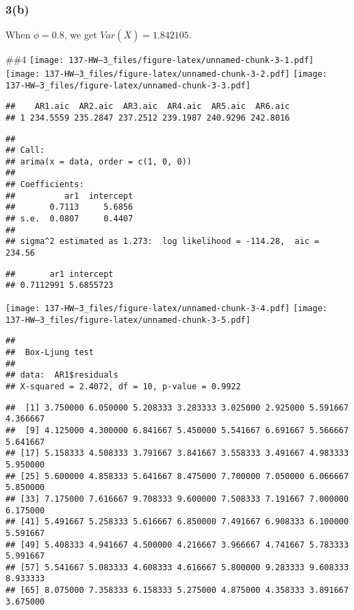 \documentclass[
]{article}
\begin{document}
\hypertarget{b-1}{%
\subsubsection{3(b)}\label{b-1}}

When \(\phi=0.8\), we get \(Var(\overline{X})= 1.842105\).

\#\#4
\texttt{[image: 137-HW--3\_files/figure-latex/unnamed-chunk-3-1.pdf]}
\texttt{[image: 137-HW--3\_files/figure-latex/unnamed-chunk-3-2.pdf]}
\texttt{[image: 137-HW--3\_files/figure-latex/unnamed-chunk-3-3.pdf]}

\begin{verbatim}
##    AR1.aic  AR2.aic  AR3.aic  AR4.aic  AR5.aic  AR6.aic
## 1 234.5559 235.2847 237.2512 239.1987 240.9296 242.8016
\end{verbatim}

\begin{verbatim}
## 
## Call:
## arima(x = data, order = c(1, 0, 0))
## 
## Coefficients:
##          ar1  intercept
##       0.7113     5.6856
## s.e.  0.0807     0.4407
## 
## sigma^2 estimated as 1.273:  log likelihood = -114.28,  aic = 234.56
\end{verbatim}

\begin{verbatim}
##       ar1 intercept 
## 0.7112991 5.6855723
\end{verbatim}

\texttt{[image: 137-HW--3\_files/figure-latex/unnamed-chunk-3-4.pdf]}
\texttt{[image: 137-HW--3\_files/figure-latex/unnamed-chunk-3-5.pdf]}

\begin{verbatim}
## 
##  Box-Ljung test
## 
## data:  AR1$residuals
## X-squared = 2.4072, df = 10, p-value = 0.9922
\end{verbatim}

\begin{verbatim}
##  [1] 3.750000 6.050000 5.208333 3.283333 3.025000 2.925000 5.591667 4.366667
##  [9] 4.125000 4.300000 6.841667 5.450000 5.541667 6.691667 5.566667 5.641667
## [17] 5.158333 4.508333 3.791667 3.841667 3.558333 3.491667 4.983333 5.950000
## [25] 5.600000 4.858333 5.641667 8.475000 7.700000 7.050000 6.066667 5.850000
## [33] 7.175000 7.616667 9.708333 9.600000 7.508333 7.191667 7.000000 6.175000
## [41] 5.491667 5.258333 5.616667 6.850000 7.491667 6.908333 6.100000 5.591667
## [49] 5.408333 4.941667 4.500000 4.216667 3.966667 4.741667 5.783333 5.991667
## [57] 5.541667 5.083333 4.608333 4.616667 5.800000 9.283333 9.608333 8.933333
## [65] 8.075000 7.358333 6.158333 5.275000 4.875000 4.358333 3.891667 3.675000
\end{verbatim}
\end{document}
